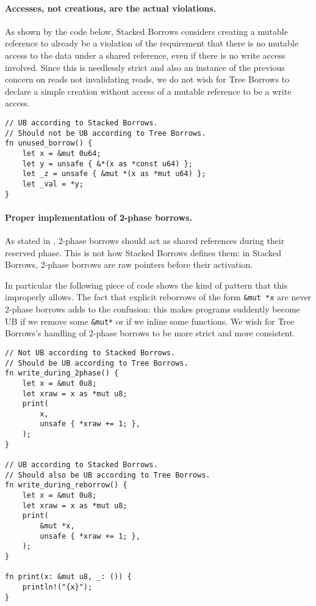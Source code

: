 \documentclass[a4paper,11pt]{article}
\theoremstyle{plain}
\theoremstyle{definition}
\theoremstyle{remark}
\begin{document}
\paragraph*{Accesses, not creations, are the actual violations.}
As shown by the code below, Stacked Borrows considers creating a mutable reference
to already be a violation of the requirement that there is no mutable access to
the data under a shared reference, even if there is no write access involved.
Since this is needlessly strict and also an instance of the previous concern on
reads not invalidating reads, we do not wish for Tree Borrows to declare a simple
creation without access of a mutable reference to be a write access.
\begin{lstlisting}
// UB according to Stacked Borrows.
// Should not be UB according to Tree Borrows.
fn unused_borrow() {
    let x = &mut 0u64;
    let y = unsafe { &*(x as *const u64) };
    let _z = unsafe { &mut *(x as *mut u64) };
    let _val = *y;
}
\end{lstlisting}

\paragraph*{Proper implementation of 2-phase borrows.}
As stated in \cite{rustc_dev_guide}, 2-phase borrows should act as shared references
during their reserved phase. This is not how Stacked Borrows defines them: in
Stacked Borrows, 2-phase borrows are raw pointers before their activation.

In particular the following piece of code shows the kind of pattern that this
improperly allows. The fact that explicit reborrows of the form \texttt{\&mut *x}
are never 2-phase borrows adds to the confusion: this makes programs suddently
become UB if we remove some \texttt{\&mut*} or if we inline some functions.
We wish for Tree Borrows's handling of 2-phase borrows to be more strict and
more consistent.
\begin{lstlisting}
// Not UB according to Stacked Borrows.
// Should be UB according to Tree Borrows.
fn write_during_2phase() {
    let x = &mut 0u8;
    let xraw = x as *mut u8;
    print(
        x,
        unsafe { *xraw += 1; },
    );
}

// UB according to Stacked Borrows.
// Should also be UB according to Tree Borrows.
fn write_during_reborrow() {
    let x = &mut 0u8;
    let xraw = x as *mut u8;
    print(
        &mut *x,
        unsafe { *xraw += 1; },
    );
}

fn print(x: &mut u8, _: ()) {
    println!("{x}");
}
\end{lstlisting}
\end{document}
